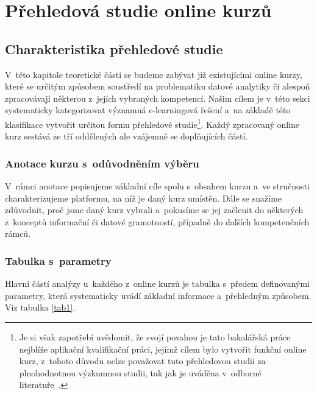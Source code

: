 \hypertarget{pux159ehledovuxe1-studie-online-kurzux16f}{%
\chapter{Přehledová studie online kurzů}\label{pux159ehledovuxe1-studie-online-kurzux16f}}

\hypertarget{charakteristika-pux159ehledovuxe9-studie}{%
\section{Charakteristika přehledové studie}\label{charakteristika-pux159ehledovuxe9-studie}}

V~této kapitole teoretické části se budeme zabývat již existujícími online kurzy, které se určitým způsobem soustředí na problematiku datové analytiky či alespoň zpracovávají některou z~jejích vybraných kompetencí. Našim cílem je v~této sekci systematicky kategorizovat významná e-learningová řešení a~na základě této klasifikace vytvořit určitou formu přehledové studie\footnote{Je si však zapotřebí uvědomit, že svojí povahou je tato bakalářská práce nejblíže aplikační kvalifikační práci, jejímž cílem bylo vytvořit funkční online kurz, z~tohoto důvodu nelze považovat tuto přehledovou studii za plnohodnotnou výzkumnou studii, tak jak je uváděna v~odborné literatuře~\parencite{mares2013}.}. Každý zpracovaný online kurz sestává ze tří oddělených ale vzájemně se doplňujících částí.

\hypertarget{anotace-kurzu-s-odux16fvodnux11bnuxedm-vuxfdbux11bru}{%
\subsection{Anotace kurzu s~odůvodněním výběru}\label{anotace-kurzu-s-odux16fvodnux11bnuxedm-vuxfdbux11bru}}

V~rámci anotace popisujeme základní cíle spolu s~obsahem kurzu a~ve stručnosti charakterizujeme platformu, na níž je daný kurz umístěn. Dále se snažíme zdůvodnit, proč jsme daný kurz vybrali a~pokusíme se jej začlenit do některých z~konceptů informační či datové gramotností, případně do dalších kompetenčních rámců.

\hypertarget{tabulka-s-parametry}{%
\subsection{Tabulka s~parametry}\label{tabulka-s-parametry}}

Hlavní částí analýzy u~každého z~online kurzů je tabulka s~předem definovanými parametry, která systematicky uvádí základní informace a~přehledným způsobem. Viz tabulka \ref{tab1}.

